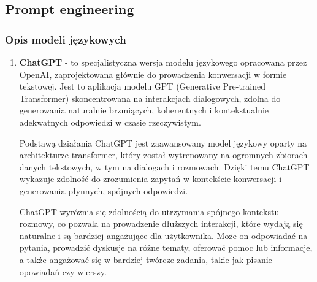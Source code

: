 \clearpage

\subsection{Prompt engineering}

\subsubsection{Opis modeli językowych}

\begin{enumerate}
 \item {\bf ChatGPT} - to specjalistyczna wersja modelu językowego opracowana przez OpenAI, zaprojektowana głównie do prowadzenia konwersacji w formie tekstowej. Jest to aplikacja modelu GPT (Generative Pre-trained Transformer) skoncentrowana na interakcjach dialogowych, zdolna do generowania naturalnie brzmiących, koherentnych i kontekstualnie adekwatnych odpowiedzi w czasie rzeczywistym.

    Podstawą działania ChatGPT jest zaawansowany model językowy oparty na architekturze transformer, który został wytrenowany na ogromnych zbiorach danych tekstowych, w tym na dialogach i rozmowach. Dzięki temu ChatGPT wykazuje zdolność do zrozumienia zapytań w kontekście konwersacji i generowania płynnych, spójnych odpowiedzi.
    
    ChatGPT wyróżnia się zdolnością do utrzymania spójnego kontekstu rozmowy, co pozwala na prowadzenie dłuższych interakcji, które wydają się naturalne i są bardziej angażujące dla użytkownika. Może on odpowiadać na pytania, prowadzić dyskusje na różne tematy, oferować pomoc lub informacje, a także angażować się w bardziej twórcze zadania, takie jak pisanie opowiadań czy wierszy.
    

\end{enumerate}
